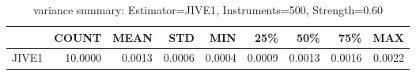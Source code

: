 \begin{table}[ht]
\centering
\caption{variance summary: Estimator=JIVE1, Instruments=500, Strength=0.60}
\begin{tabular}{lrrrrrrrr}
\toprule
 & COUNT & MEAN & STD & MIN & 25\% & 50\% & 75\% & MAX \\
\midrule
JIVE1 & 10.0000 & 0.0013 & 0.0006 & 0.0004 & 0.0009 & 0.0013 & 0.0016 & 0.0022 \\
\bottomrule
\end{tabular}
\end{table}

